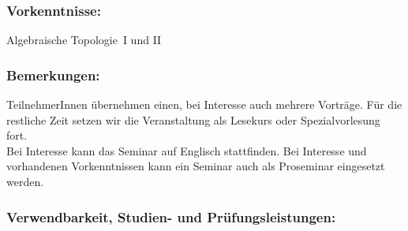 \documentclass[a4paper,10pt]{article}
\begin{document}
\subsubsection*{\large
    Vorkenntnisse:
}
Algebraische Topologie~I und II
\subsubsection*{\large
    Bemerkungen:
}
TeilnehmerInnen übernehmen einen, bei Interesse auch mehrere Vorträge.
Für die restliche Zeit setzen wir die Veranstaltung als Lesekurs oder Spezialvorlesung fort. \\
Bei Interesse kann das Seminar auf Englisch stattfinden.
Bei Interesse und vorhandenen Vorkenntnissen kann ein Seminar auch als Proseminar eingesetzt werden.
\cleardoublepage
\subsubsection*{\large
    Verwendbarkeit, Studien- und Prüfungsleistungen:
}
\end{document}
